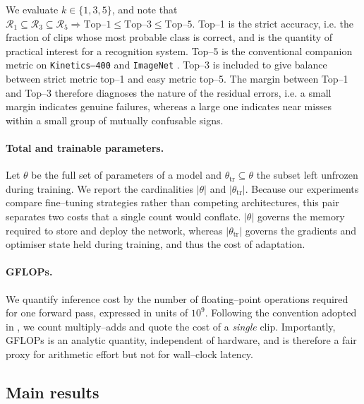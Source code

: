 We evaluate $k \in \{1, 3, 5\}$, and note that
$\mathcal R_1 \subseteq \mathcal R_3 \subseteq \mathcal R_5 \Rightarrow \text{Top--}1 \le \text{Top--}3 \le \text{Top--}5$.
Top–1 is the strict accuracy, i.e. the fraction of clips whose most probable class is correct, and is the quantity of practical interest for a recognition system.
Top–5 is the conventional companion metric on \texttt{Kinetics–400} \cite{kay2017kinetics} and \texttt{ImageNet} \cite{Russakovsky2015}.
Top–3 is included to give balance between strict metric top–1 and easy metric top–5.
The margin between Top–1 and Top–3 therefore diagnoses the nature of the residual errors, i.e. a small margin indicates genuine failures, whereas a large one indicates near misses within a small group of mutually confusable signs.

\paragraph{Total and trainable parameters.}
Let $\theta$ be the full set of parameters of a model and $\theta_{\text{tr}} \subseteq \theta$ the subset left unfrozen during training.
We report the cardinalities $|\theta|$ and $|\theta_{\text{tr}}|$.
Because our experiments compare fine–tuning strategies rather than competing architectures, this pair separates two costs that a single count would conflate.
$|\theta|$ governs the memory required to store and deploy the network, whereas $|\theta_{\text{tr}}|$ governs the gradients and optimiser state held during training, and thus the cost of adaptation.

\paragraph{GFLOPs.}
We quantify inference cost by the number of floating–point operations required for one forward pass, expressed in units of $10^9$.
Following the convention adopted in \cite{feichtenhofer2020x3d, tan2019efficientnet}, we count multiply--adds and quote the cost of a \textit{single} clip.
Importantly, GFLOPs is an analytic quantity, independent of hardware, and is therefore a fair proxy for arithmetic effort but not for wall--clock latency.





\subsection{Main results}
